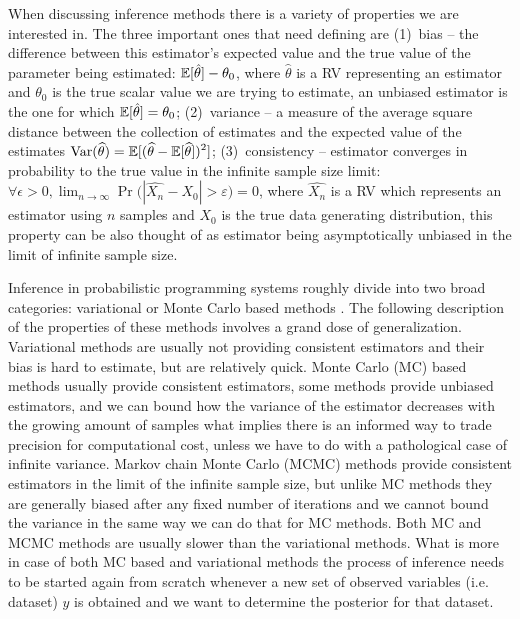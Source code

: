 \documentclass[12pt]{article}
\begin{document}
When discussing inference methods there is a variety of properties we are interested in.
The three important ones that need defining are 
(1)~bias -- the difference between this estimator's expected value and the true value of the parameter being estimated: 
$\mathbb{E} [\hat{\theta}] - \theta_0$, 
where $\hat{\theta}$ is a RV representing an estimator and $\theta_0$ is the true scalar value we are trying to estimate,
an unbiased estimator is the one for which $\mathbb{E} [\hat{\theta}] = \theta_0$;
(2)~variance -- a measure of the average square distance between the collection of estimates and the expected value of the estimates
${\displaystyle \operatorname {Var} ({\widehat {\theta }})=\mathbb{E} [({\widehat {\theta }}-\mathbb{E} [{\widehat {\theta }}])^{2}]}$;
(3)~consistency -- estimator converges in probability to the true value in the infinite sample size limit: 
$\forall \epsilon>0, \lim _{n\to \infty}\Pr {\big (}|\hat{X_{n}}-X_0| > \varepsilon {\big )}=0$, 
where $\hat{X_n}$ is a RV which represents an estimator using $n$ samples and $X_0$ is the true data generating distribution,
this property can be also thought of as estimator being asymptotically unbiased in the limit of infinite sample size.

Inference in probabilistic programming systems roughly divide into two broad categories: variational \citep{WainwrightJordan2008} or Monte Carlo based methods \citep{mcbook}.
The following description of the properties of these methods involves a grand dose of generalization.
Variational methods are usually not providing consistent estimators and their bias is hard to estimate, but are relatively quick.
Monte Carlo (MC) based methods usually provide consistent estimators, some methods provide unbiased estimators, and we can bound how the variance of the estimator decreases with the growing amount of samples what implies there is an informed way to trade precision for computational cost, unless we have to do with a pathological case of infinite variance. 
Markov chain Monte Carlo (MCMC) methods provide consistent estimators in the limit of the infinite sample size, but unlike MC methods they are generally biased after any fixed number of iterations \citep{JacobEtAl2017} and we cannot bound the variance in the same way we can do that for MC methods.
Both MC and MCMC methods are usually slower than the variational methods.
What is more in case of both MC based and variational methods the process of inference needs to be started again from scratch whenever a new set of observed variables (i.e. dataset) $y$ is obtained and we want to determine the posterior for that dataset.  
\end{document}
